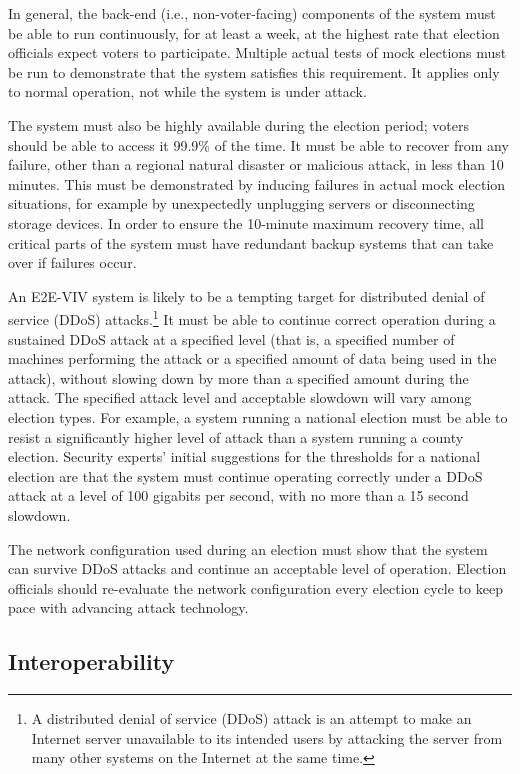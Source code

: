 In general, the back-end (i.e., non-voter-facing) components of the
system must be able to run continuously, for at least a week, at the
highest rate that election officials expect voters to
participate. Multiple actual tests of mock elections must be run to
demonstrate that the system satisfies this requirement. It applies
only to normal operation, not while the system is under attack.

The system must also be highly available during the election period;
voters should be able to access it 99.9\% of the time. It must be able
to recover from any failure, other than a regional natural disaster or
malicious attack, in less than 10 minutes. This must be demonstrated
by inducing failures in actual mock election situations, for example
by unexpectedly unplugging servers or disconnecting storage
devices. In order to ensure the 10-minute maximum recovery time, all
critical parts of the system must have redundant backup systems that
can take over if failures occur.

An E2E-VIV system is likely to be a tempting target for distributed
denial of service (DDoS) attacks.\footnote{A distributed denial of
  service (DDoS) attack is an attempt to make an Internet server
  unavailable to its intended users by attacking the server from many
  other systems on the Internet at the same time.} It must be able to
continue correct operation during a sustained DDoS attack at a
specified level (that is, a specified number of machines performing
the attack or a specified amount of data being used in the attack),
without slowing down by more than a specified amount during the
attack.  The specified attack level and acceptable slowdown will vary
among election types. For example, a system running a national
election must be able to resist a significantly higher level of attack
than a system running a county election. Security experts' initial
suggestions for the thresholds for a national election are that the
system must continue operating correctly under a DDoS attack at a
level of 100 gigabits per second, with no more than a 15 second
slowdown.

The network configuration used during an election must show that the
system can survive DDoS attacks and continue an acceptable level of
operation. Election officials should re-evaluate the network
configuration every election cycle to keep pace with advancing attack
technology.

\subsection{Interoperability}
\label{sec:interoperability}

